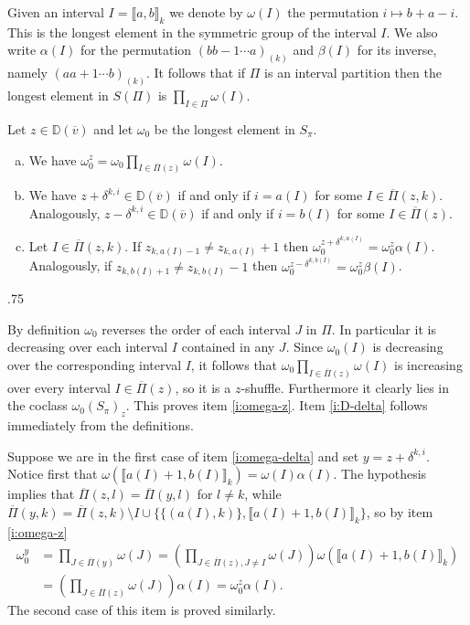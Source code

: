 \documentclass[11pt,fleqn]{amsart}
\makeatletter
\renewcommand\proofname{Proof}
\renewenvironment{proof}[1][\textit{\proofname}]{\par
 \pushQED{\qed}%
 \normalfont \topsep.75\paraskip\relax
 \trivlist
 \item[\hskip\labelsep
 \itshape
 #1\@addpunct{.}]\ignorespaces
}{%
 \popQED\endtrivlist\@endpefalse
}
\newcounter{para}[section]
\newcommand\vv{\overline{v}}
\newcommand\PPi{\overline \Pi}
\newcommand\interval[1]{\llbracket #1 \rrbracket}
\newcommand\DD{\mathbb D}
\makeatother
\begin{document}
Given an interval $I = \interval{a,b}_k$ we denote by $\omega(I)$ the 
permutation $i \mapsto  b+a-i$. This is the longest element in the symmetric
group of the interval $I$. We also write $\alpha(I)$ for the permutation $(b b-
1 \cdots a)_{(k)}$ and $\beta(I)$ for its inverse, namely $(a a+1 \cdots 
b)_{(k)}$. It follows that if $\Pi$ is an interval partition then the longest 
element in $S(\Pi)$ is $\prod_{I \in \Pi} \omega(I)$.
\begin{Lemma*}
Let $z\in \DD(\vv)$ and let $\omega_0$ be the longest element in $S_\pi$.
\begin{enumerate}[(a)]
\item 
\label{i:omega-z}
We have $\omega_0^z = \omega_0 \prod_{I \in \PPi(z)} \omega(I)$.

\item 
\label{i:D-delta}
We have $z + \delta^{k,i} \in \DD(\vv)$ if and only if $i = a(I)$ for some $I 
	\in \PPi(z,k)$. Analogously, $z - \delta^{k,i} \in \DD(\vv)$ if and only 
	if $i = b(I)$ for some $I \in \PPi(z)$.

\item 
\label{i:omega-delta}
Let $I \in \PPi(z,k)$. If $z_{k,a(I)-1} \neq z_{k,a(I)} + 1$ then 
	$\omega_0^{z + \delta^{k,a(I)}} = \omega_0^z \alpha(I)$. Analogously,
	if $z_{k,b(I)+1} \neq z_{k,b(I)} - 1$ then $\omega_0^{z - \delta^{k,b(I)}} 
	= \omega_0^z \beta(I)$.
\end{enumerate}
\end{Lemma*}
\begin{proof}
By definition $\omega_0$ reverses the order of each interval $J$ in $\Pi$. In
particular it is decreasing over each interval $I$ contained in any $J$. Since 
$\omega_0(I)$ is decreasing over the corresponding interval $I$, it follows 
that $\omega_0 \prod_{I \in \PPi(z)} \omega(I)$ is increasing over every 
interval $I \in \PPi(z)$, so it is a $z$-shuffle. Furthermore it clearly lies 
in the coclass $\omega_0 (S_\pi)_z$. This proves item \ref{i:omega-z}.
Item \ref{i:D-delta} follows immediately from the definitions. 

Suppose we are in the first case of item \ref{i:omega-delta} and set $y = z + 
\delta^{k,i}$. Notice first that $\omega(\interval{a(I)+1,b(I)}_k) = 
\omega(I) \alpha(I)$. The hypothesis implies that $\PPi(z,l) = \PPi(y,l)$ for 
$l \neq k$, while $\PPi(y,k) = \PPi(z,k) \setminus I \cup \{\{(a(I),k)\},
\interval{a(I)+1,b(I)}_k\}$, so by item \ref{i:omega-z}
\begin{align*}
\omega_0^y 
	&= \prod_{J \in \PPi(y)} \omega(J)
	= \left(\prod_{J \in \PPi(z), J \neq I} \omega(J)\right) 
		\omega(\interval{a(I)+1,b(I)}_k) \\
	&= \left(\prod_{J \in \PPi(z)} \omega(J)\right)\alpha(I)
	= \omega_0^z \alpha(I).
\end{align*}
The second case of this item is proved similarly.
\end{proof}
\end{document}

